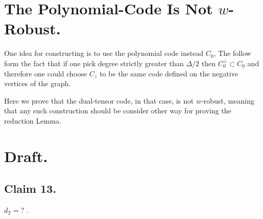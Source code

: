 
\section{The Polynomial-Code Is Not $w$-Robust.}
One idea for constructing is to use the polynomial code instead $C_{0}$, The follow form the fact that if one pick degree strictly greater than $\Delta/2$ then $C_{0}^{\perp} \subset C_{0}$ and therefore one could choose $C_{z}$ to be the same code defined on the negative vertices of the graph. 

Here we prove that the dual-tensor code, in that case, is not $w$-robust, meaning that any such construction should be consider other way for proving the reduction Lemma.  


\section{Draft.} 
\subsection{Claim 13.}

\begin{claim}
  \label{claim:Tdeg} $d_{T} = ? $ . 
\end{claim}

